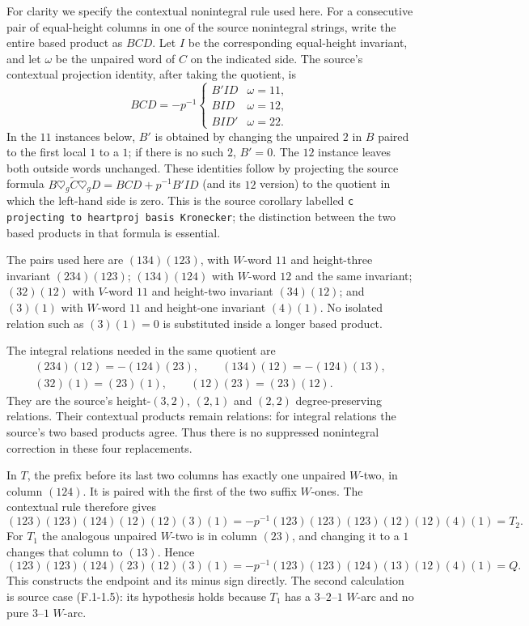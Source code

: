 For clarity we specify the contextual nonintegral rule used here.
For a consecutive pair of equal-height columns in one of the source
nonintegral strings, write the entire based product as $BCD$.
Let $I$ be the corresponding equal-height invariant, and let
$\omega$ be the unpaired word of $C$ on the indicated side. The
source's contextual projection identity, after taking the quotient,
is
\[
 BCD=-p^{-1}\begin{cases}B'ID&\omega=11,\\
 BID&\omega=12,\\BID'&\omega=22.\end{cases}
\]
In the $11$ instances below, $B'$ is obtained by changing the
unpaired $2$ in $B$ paired to the first local $1$ to a $1$; if
there is no such $2$, $B'=0$. The $12$ instance leaves both outside
words unchanged. These identities follow by projecting the source
formula $B\mathbin{\heartsuit_g}\widetilde C\mathbin{\heartsuit_g}D
=BCD+p^{-1}B'ID$ (and its $12$ version) to the quotient in which
the left-hand side is zero. This is the source corollary labelled
\texttt{c projecting to heartproj basis Kronecker}; the distinction
between the two based products in that formula is essential.

The pairs used here are $(134)(123)$, with $W$-word $11$ and
height-three invariant $(234)(123)$; $(134)(124)$ with $W$-word
$12$ and the same invariant; $(32)(12)$ with $V$-word $11$ and
height-two invariant $(34)(12)$; and $(3)(1)$ with $W$-word $11$
and height-one invariant $(4)(1)$. No isolated relation such as
$(3)(1)=0$ is substituted inside a longer based product.

The integral relations needed in the same quotient are
\begin{gather*}
 (234)(12)=-(124)(23),\qquad (134)(12)=-(124)(13),\\
 (32)(1)=(23)(1),\qquad (12)(23)=(23)(12).
\end{gather*}
They are the source's height-$(3,2)$, $(2,1)$ and $(2,2)$
degree-preserving relations. Their contextual products remain
relations: for integral relations the source's two based products
agree. Thus there is no suppressed nonintegral correction in these
four replacements.

In $T$, the prefix before its last two columns has exactly one
unpaired $W$-two, in column $(124)$. It is paired with the first
of the two suffix $W$-ones. The contextual rule therefore gives
\[
 (123)(123)(124)(12)(12)(3)(1)
 =-p^{-1}(123)(123)(123)(12)(12)(4)(1)=T_2.
\]
For $T_1$ the analogous unpaired $W$-two is in column $(23)$,
and changing it to a $1$ changes that column to $(13)$. Hence
\[
 (123)(123)(124)(23)(12)(3)(1)
 =-p^{-1}(123)(123)(124)(13)(12)(4)(1)=Q.
\]
This constructs the endpoint and its minus sign directly. The second
calculation is source case (F.1-1.5): its hypothesis holds because
$T_1$ has a $3$--$2$--$1$ $W$-arc and no pure $3$--$1$ $W$-arc.

